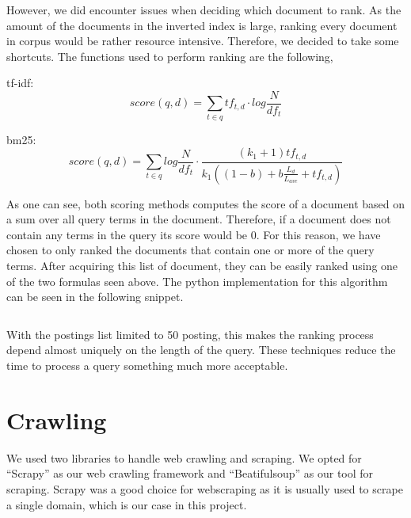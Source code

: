 \documentclass[]{article}
\begin{document}
\inputminted[]{python}{snip/topklist.py} 

However, we did encounter issues when deciding which document to rank. As the amount of the documents in the inverted index is large, ranking every document in corpus would be rather resource intensive. Therefore, we decided to take some shortcuts. The functions used to perform ranking are the following,

tf-idf:
\[ score(q,d) = \sum_{t \in q}^{} tf_{t,d} \cdot log\frac{N}{df_t} \]

bm25:
\[ score(q,d) = \sum_{t \in q}^{} log\frac{N}{df_t} \cdot \frac{(k_1+1)tf_{t,d}}{k_1((1-b) + b\frac{L_d}{L_{ave}} + tf_{t,d})} \]

As one can see, both scoring methods computes the score of a document based on a sum over all query terms in the document. Therefore, if a document does not contain any terms in the query its score would be 0. For this reason, we have chosen to only ranked the documents that contain one or more of the query terms. After acquiring this list of document, they can be easily ranked using one of the two formulas seen above. The python implementation for this algorithm can be seen in the following snippet.

\inputminted[]{python}{snip/documentsrank.py}

With the postings list limited to 50 posting, this makes the ranking process depend almost uniquely on the length of the query. These techniques reduce the time to process a query something much more acceptable.

\newpage
\section{Crawling}
We used two libraries to handle web crawling and scraping. We opted for ``Scrapy'' as our web crawling framework and ``Beatifulsoup'' as our tool for scraping. Scrapy was a good choice for webscraping as it is usually used to scrape a single domain, which is our case in this project. 
\end{document}

